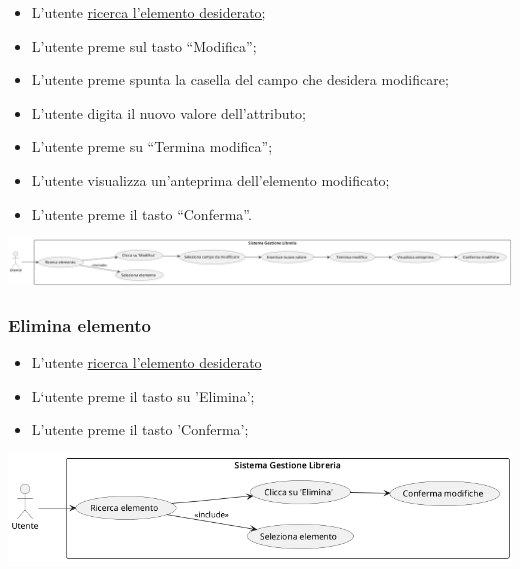 \begin{itemize}
  \item
    L'utente \underline{ricerca l'elemento desiderato;}
  \item
    L'utente preme sul tasto ``Modifica'';
  \item
    L'utente preme spunta la casella del campo che desidera modificare;
  \item
    L'utente digita il nuovo valore dell'attributo;
  \item
    L'utente preme su ``Termina modifica'';
  \item
    L'utente visualizza un'anteprima dell'elemento modificato;
  \item
    L'utente preme il tasto ``Conferma''.
\end{itemize}

\begin{center}
  \includegraphics[width=\textwidth]{media/useCase4.png}
\end{center}

\subsubsection{Elimina elemento}\label{elimina-elemento}

\begin{itemize}
  \item
    L'utente \underline{ricerca l'elemento desiderato}
  \item
    L`utente preme il tasto su 'Elimina';
  \item
    L'utente preme il tasto 'Conferma';
\end{itemize}
\begin{center}
  \includegraphics[width=\textwidth]{media/useCase5.png}
\end{center}

